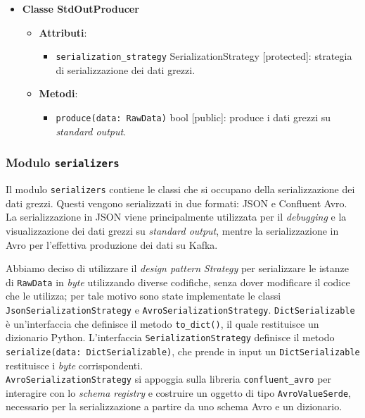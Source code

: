 \begin{itemize}
\begin{itemize}
\begin{itemize}
		            \end{itemize}
	      \end{itemize}
	\item \textbf{Classe StdOutProducer}
	      \begin{itemize}
		      \item \textbf{Attributi}:
		            \begin{itemize}
			            \item \texttt{serialization\_strategy} SerializationStrategy [protected]: strategia di serializzazione dei dati grezzi.
		            \end{itemize}
		      \item \textbf{Metodi}:
		            \begin{itemize}
			            \item \texttt{produce(data: RawData)} bool [public]: produce i dati grezzi su \textit{standard output}.
		            \end{itemize}
	      \end{itemize}
\end{itemize}

\subsubsection{Modulo \texttt{serializers}}
Il modulo \texttt{serializers} contiene le classi che si occupano della serializzazione dei dati grezzi. Questi vengono serializzati in due formati: JSON e Confluent Avro.
La serializzazione in JSON viene principalmente utilizzata per il \textit{debugging} e la visualizzazione dei dati grezzi su \textit{standard output}, mentre la serializzazione in Avro
per l'effettiva produzione dei dati su Kafka.

Abbiamo deciso di utilizzare il \textit{design pattern} \textit{Strategy} per serializzare le istanze di \texttt{RawData} in \textit{byte} utilizzando diverse codifiche, senza dover modificare il codice che le utilizza;
per tale motivo sono state implementate le classi \\\texttt{JsonSerializationStrategy} e \texttt{AvroSerializationStrategy}.
\texttt{DictSerializable} è un'interfaccia che definisce il metodo \texttt{to\_dict()}, il quale restituisce un dizionario Python.
L'interfaccia \texttt{SerializationStrategy} definisce il metodo \texttt{serialize(data: DictSerializable)}, che prende in input un \texttt{DictSerializable} restituisce i \textit{byte} corrispondenti.
\\\texttt{AvroSerializationStrategy} si appoggia sulla libreria \texttt{confluent\_avro} per interagire con lo \textit{schema registry} e costruire un oggetto di tipo
\texttt{AvroValueSerde}, necessario per la serializzazione a partire da uno schema Avro e un dizionario.

